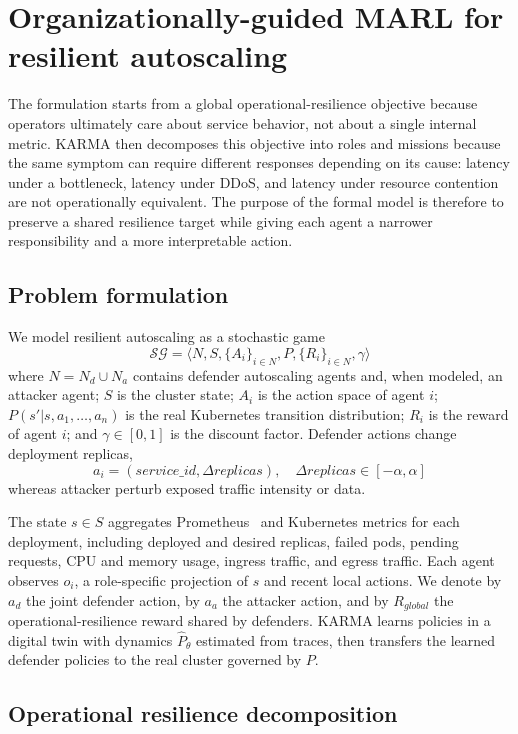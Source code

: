 \documentclass[journal]{IEEEtran}
\begin{document}
\section{Organizationally-guided MARL for resilient autoscaling}
\label{sec:org_marl}

The formulation starts from a global operational-resilience objective because operators ultimately care about service behavior, not about a single internal metric. KARMA then decomposes this objective into roles and missions because the same symptom can require different responses depending on its cause: latency under a bottleneck, latency under DDoS, and latency under resource contention are not operationally equivalent. The purpose of the formal model is therefore to preserve a shared resilience target while giving each agent a narrower responsibility and a more interpretable action.

\subsection{Problem formulation}
\label{subsec:problem_formulation}

We model resilient autoscaling as a stochastic game
\[
  \mathcal{SG}=\langle N,S,\{A_i\}_{i\in N},P,\{R_i\}_{i\in N},\gamma\rangle
\]
where $N=N_d\cup N_a$ contains defender autoscaling agents and, when modeled, an attacker agent; $S$ is the cluster state; $A_i$ is the action space of agent $i$; $P(s'|s,a_1,\ldots,a_n)$ is the real Kubernetes transition distribution; $R_i$ is the reward of agent $i$; and $\gamma\in[0,1]$ is the discount factor. Defender actions change deployment replicas,
\[
  a_i=(service\_id,\Delta replicas), \quad \Delta replicas\in[-\alpha,\alpha]
\]
whereas attacker perturb exposed traffic intensity or data.

The state $s\in S$ aggregates Prometheus~\cite{prometheus} and Kubernetes metrics for each deployment, including deployed and desired replicas, failed pods, pending requests, CPU and memory usage, ingress traffic, and egress traffic. Each agent observes $o_i$, a role-specific projection of $s$ and recent local actions. We denote by $a_d$ the joint defender action, by $a_a$ the attacker action, and by $R_{global}$ the operational-resilience reward shared by defenders. KARMA learns policies in a digital twin with dynamics $\hat{P}_\theta$ estimated from traces, then transfers the learned defender policies to the real cluster governed by $P$.

\subsection{Operational resilience decomposition}
\label{subsec:resilience_decomposition}
\end{document}
